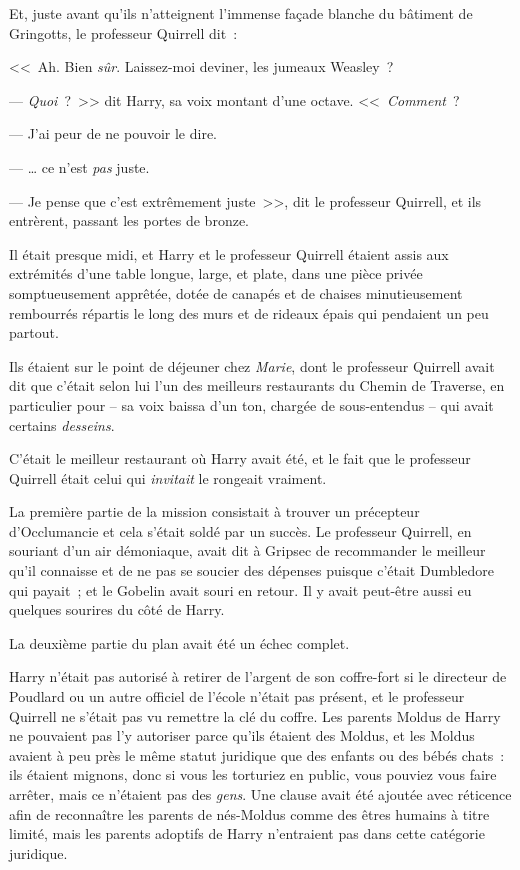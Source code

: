 Et, juste avant qu'ils n'atteignent l'immense façade blanche du bâtiment de Gringotts, le professeur Quirrell dit~:

<<~Ah. Bien \emph{sûr}. Laissez-moi deviner, les jumeaux Weasley~?

--- \emph{Quoi}~?~>> dit Harry, sa voix montant d'une octave. <<~\emph{Comment}~?

--- J'ai peur de ne pouvoir le dire.

--- … ce n'est \emph{pas} juste.

--- Je pense que c'est extrêmement juste~>>, dit le professeur Quirrell, et ils entrèrent, passant les portes de bronze.

\later

Il était presque midi, et Harry et le professeur Quirrell étaient assis aux extrémités d'une table longue, large, et plate, dans une pièce privée somptueusement apprêtée, dotée de canapés et de chaises minutieusement rembourrés répartis le long des murs et de rideaux épais qui pendaient un peu partout.

Ils étaient sur le point de déjeuner chez \emph{Marie}, dont le professeur Quirrell avait dit que c'était selon lui l'un des meilleurs restaurants du Chemin de Traverse, en particulier pour -- sa voix baissa d'un ton, chargée de sous-entendus -- qui avait certains \emph{desseins}.

C'était le meilleur restaurant où Harry avait été, et le fait que le professeur Quirrell était celui qui \emph{invitait} le rongeait vraiment.

La première partie de la mission consistait à trouver un précepteur d'Occlumancie et cela s'était soldé par un succès. Le professeur Quirrell, en souriant d'un air démoniaque, avait dit à Gripsec de recommander le meilleur qu'il connaisse et de ne pas se soucier des dépenses puisque c'était Dumbledore qui payait~; et le Gobelin avait souri en retour. Il y avait peut-être aussi eu quelques sourires du côté de Harry.

La deuxième partie du plan avait été un échec complet.

Harry n'était pas autorisé à retirer de l'argent de son coffre-fort si le directeur de Poudlard ou un autre officiel de l'école n'était pas présent, et le professeur Quirrell ne s'était pas vu remettre la clé du coffre. Les parents Moldus de Harry ne pouvaient pas l'y autoriser parce qu'ils étaient des Moldus, et les Moldus avaient à peu près le même statut juridique que des enfants ou des bébés chats~: ils étaient mignons, donc si vous les torturiez en public, vous pouviez vous faire arrêter, mais ce n'étaient pas des \emph{gens}. Une clause avait été ajoutée avec réticence afin de reconnaître les parents de nés-Moldus comme des êtres humains à titre limité, mais les parents adoptifs de Harry n'entraient pas dans cette catégorie juridique.

